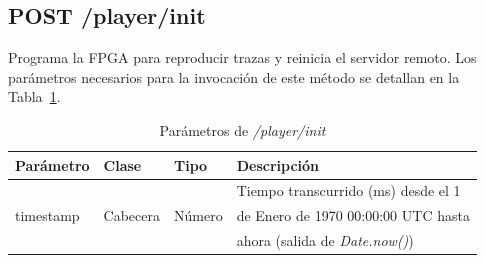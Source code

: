 %
%
\subsection{POST /player/init}

Programa la \gls{FPGA} para reproducir \glspl{traza} y reinicia el servidor remoto.
Los parámetros necesarios para la invocación de este método se detallan en la Tabla~\ref{extra:api:playerinit:invocacion}.

\begin{table}[H]
\centering
\begin{tabular}{|l|l|l|l|}
\hline
\rowcolor[HTML]{F5F5F5}
\textbf{Parámetro}  & \textbf{Clase} & \textbf{Tipo} & \textbf{Descripción}                  \\ \hline
                    &                &               & Tiempo transcurrido (ms) desde el 1   \\
timestamp           & Cabecera       & Número        & de Enero de 1970 00:00:00 UTC hasta   \\
                    &                &               & ahora (salida de \textit{Date.now()}) \\ \hline
\end{tabular}
\caption{Parámetros de \textit{/player/init}}
\label{extra:api:playerinit:invocacion}
\end{table}

